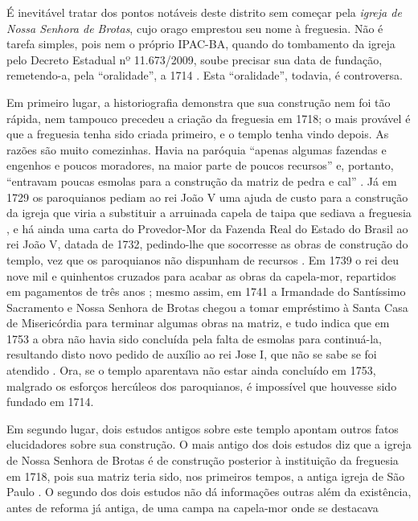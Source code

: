 É inevitável tratar dos pontos notáveis deste distrito sem começar pela \textit{igreja de Nossa Senhora de Brotas}, cujo orago emprestou seu nome à freguesia. Não é tarefa simples, pois nem o próprio IPAC-BA, quando do tombamento da igreja pelo Decreto Estadual nº 11.673/2009, soube precisar sua data de fundação, remetendo-a, pela ``oralidade'', a 1714 \cite{ipac_brotas_2015}. Esta ``oralidade'', todavia, é controversa. 

Em primeiro lugar, a historiografia demonstra que sua construção nem foi tão rápida, nem tampouco precedeu a criação da freguesia em 1718; o mais provável é que a freguesia tenha sido criada primeiro, e o templo tenha vindo depois. As razões são muito comezinhas. Havia na paróquia ``apenas algumas fazendas e engenhos e poucos moradores, na maior parte de poucos recursos'' e, portanto, ``entravam poucas esmolas para a construção da matriz de pedra e cal'' \cite[p.~10]{ott_engenhos_1996}. Já em 1729 os paroquianos pediam ao rei João V uma ajuda de custo para a construção da igreja que viria a substituir a arruinada capela de taipa que sediava a freguesia \cite[p.~10]{ott_engenhos_1996}, e há ainda uma carta do Provedor-Mor da Fazenda Real do Estado do Brasil ao rei João V, datada de 1732, pedindo-lhe que socorresse as obras de construção do templo, vez que os paroquianos não dispunham de recursos \cite[p.~30]{vivas_botelho_2011}. Em 1739 o rei deu nove mil e quinhentos cruzados para acabar as obras da capela-mor, repartidos em pagamentos de três anos \cite[p.~10]{ott_engenhos_1996}; mesmo assim, em 1741 a Irmandade do Santíssimo Sacramento e Nossa Senhora de Brotas chegou a tomar empréstimo à Santa Casa de Misericórdia para terminar algumas obras na matriz, e tudo indica que em 1753 a obra não havia sido concluída pela falta de esmolas para continuá-la, resultando disto novo pedido de auxílio ao rei Jose I, que não se sabe se foi atendido \cite[p.~10]{ott_engenhos_1996}. Ora, se o templo aparentava não estar ainda concluído em 1753, malgrado os esforços hercúleos dos paroquianos, é impossível que houvesse sido fundado em 1714. 

Em segundo lugar, dois estudos antigos sobre este templo \cite{campos_brotas_1942,texbar_capellas_1930} apontam outros fatos elucidadores sobre sua construção. O mais antigo dos dois estudos diz que a igreja de Nossa Senhora de Brotas é de construção posterior à instituição da freguesia em 1718, pois sua matriz teria sido, nos primeiros tempos, a antiga igreja de São Paulo \cite[p.~344]{texbar_capellas_1930}. O segundo dos dois estudos não dá informações outras além da existência, antes de reforma já antiga, de uma campa na capela-mor onde se destacava 

